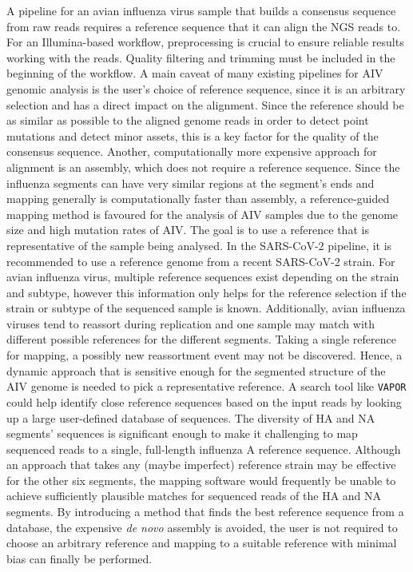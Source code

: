 A pipeline for an avian influenza virus sample that builds a consensus sequence from raw reads requires a reference sequence that it can align the \ac{NGS} reads to. For an Illumina-based workflow, preprocessing is crucial to ensure reliable results working with the reads. Quality filtering and trimming must be included in the beginning of the workflow. A main caveat of many existing pipelines for \ac{AIV} genomic analysis is the user's choice of reference sequence, since it is an arbitrary selection and has a direct impact on the alignment. Since the reference should be as similar as possible to the aligned genome reads in order to detect point mutations and detect minor assets, this is a key factor for the quality of the consensus sequence. Another, computationally more expensive approach for alignment is an assembly, which does not require a reference sequence. Since the influenza segments can have very similar regions at the segment's ends and mapping generally is computationally faster than assembly, a reference-guided mapping method is favoured for the analysis of \ac{AIV} samples due to the genome size and high mutation rates of \ac{AIV}. The goal is to use a reference that is representative of the sample being analysed. In the \ac{SARS-CoV-2} pipeline, it is recommended to use a reference genome from a recent \ac{SARS-CoV-2} strain. For avian influenza virus, multiple reference sequences exist depending on the strain and subtype, however this information only helps for the reference selection if the strain or subtype of the sequenced sample is known. Additionally, avian influenza viruses tend to reassort during replication and one sample may match with different possible references for the different segments. Taking a single reference for mapping, a possibly new reassortment event may not be discovered. Hence, a dynamic approach that is sensitive enough for the segmented structure of the \ac{AIV} genome is needed to pick a representative reference. A search tool like \texttt{VAPOR} could help identify close reference sequences based on the input reads by looking up a large user-defined database of sequences. The diversity of \ac{HA} and \ac{NA} segments' sequences is significant enough to make it challenging to map sequenced reads to a single, full-length influenza A reference sequence. Although an approach that takes any (maybe imperfect) reference strain may be effective for the other six segments, the mapping software would frequently be unable to achieve sufficiently plausible matches for sequenced reads of the \ac{HA} and \ac{NA} segments. By introducing a method that finds the best reference sequence from a database, the expensive \textit{de novo} assembly is avoided, the user is not required to choose an arbitrary reference and mapping to a suitable reference with minimal bias can finally be performed. \\
